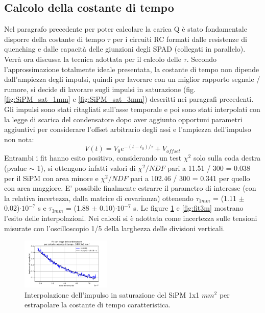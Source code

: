 \documentclass[journal]{IEEEtran}
\begin{document}
\subsection{\textbf{Calcolo della costante di tempo}}
Nel paragrafo precedente per poter calcolare la carica Q è stato fondamentale disporre della costante di tempo $\tau$ per i circuiti RC formati dalle resistenze di quenching e dalle capacità delle giunzioni degli SPAD (collegati in parallelo). Verrà ora discussa la tecnica adottata per il calcolo delle $\tau$. Secondo l'approssimazione totalmente ideale presentata, la costante di tempo non dipende dall'ampiezza degli impulsi, quindi per lavorare con un miglior rapporto segnale / rumore, si decide di lavorare sugli impulsi in saturazione (fig. \ref{fig:SiPM_sat_1mm} e \ref{fig:SiPM_sat_3mm}) descritti nei paragrafi precedenti. Gli impulsi sono stati ritagliati sull'asse temporale e poi sono stati interpolati con la legge di scarica del condensatore dopo aver aggiunto opportuni parametri aggiuntivi per considerare l'offset arbitrario degli assi e l'ampiezza dell'impulso non nota:
\begin{equation}
    V(t) = V_0 e^{-(t-t_0)/\tau} + V_{offset}
\end{equation}
Entrambi i fit hanno esito positivo, considerando un test $\chi^2$ solo sulla coda destra (pvalue $\sim$ 1), si ottengono infatti valori di $\chi^2 / NDF$ pari a 11.51  /  300 = 0.038 per il SiPM con area minore e $\chi^2 / NDF$ pari a 102.46 /  300 = 0.341 per quello con area maggiore. E' possibile finalmente estrarre il parametro di interesse (con la relativa incertezza, dalla matrice di covarianza) ottenendo $\tau_{1mm}$ = (1.11 $\pm$ 0.02)$\cdot 10^{-7}$ s e $\tau_{3mm}$ = (1.88 $\pm$ 0.10)$\cdot 10^{-7}$ s. Le figure \ref{fig:fit1m} e \ref{fig:fit3m} mostrano l'esito delle interpolazioni. Nei calcoli si è adottata come incertezza sulle tensioni misurate con l'oscilloscopio 1/5 della larghezza delle divisioni verticali.

\begin{figure}[H]%
\begin{center}
\includegraphics[width=0.38\textwidth]{analysis/output/SiPM_fit_3mm.pdf}
\caption{Interpolazione dell'impulso in saturazione del SiPM 1x1 $mm^2$ per estrapolare la costante di tempo caratteristica.}
\label{fig:fit1m}
\end{center}
\end{figure}
\end{document}
